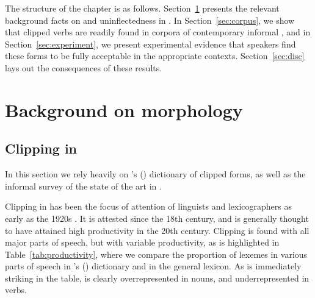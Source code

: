 \documentclass[output=paper,colorlinks,citecolor=brown]{langscibook}
\begin{document}
The structure of the chapter is as follows. Section~\ref{sec:background} presents the relevant background facts on  and uninflectedness in . In Section~\ref{sec:corpus}, we show that clipped verbs are readily found in corpora of contemporary informal , and in Section~\ref{sec:experiment}, we present experimental evidence that  speakers find these forms to be fully acceptable in the appropriate contexts. Section~\ref{sec:disc} lays out the consequences of these results.


\section{Background on  morphology}\label{sec:background}

\subsection{Clipping in }

In this section we rely heavily on \citeauthor{antoine2000}'s (\citeyear{antoine2000}) dictionary of clipped forms, as well as the informal survey of the state of the art in \citet{cerquiglini2019}.

Clipping in  has been the focus of attention of linguists and lexicographers as early as the 1920s \citep{kjellman1920}. It is attested since the 18th century, and is generally thought to have attained high productivity in the 20th century. Clipping is found with all major parts of speech, but with variable productivity, as is highlighted in Table~\ref{tab:productivity}, where we compare the proportion of lexemes in various parts of speech in \citeauthor{antoine2000}'s (\citeyear{antoine2000}) dictionary and in the general lexicon. As is immediately striking in the table,  is clearly overrepresented in nouns, and underrepresented in verbs. 

\newcommand{\iobare}[2]{\ensuremath{\textit{#1}>\textit{#2}}}

\newcommand{\io}[3]{\iobare{#1}{#2}\ \textrm{‘#3’}}
\end{document}

